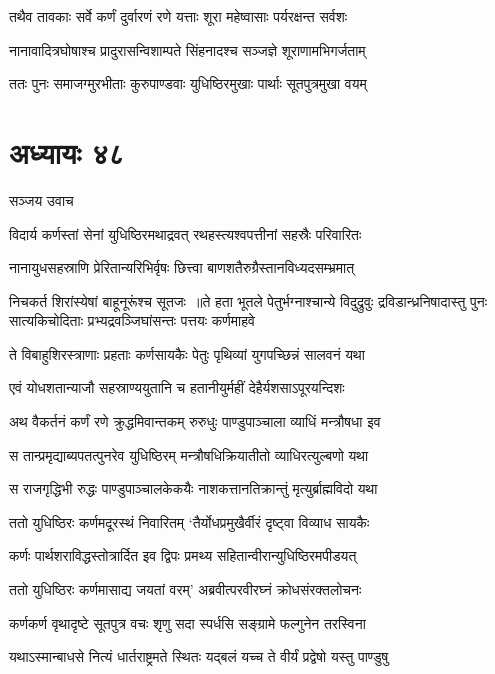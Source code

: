 \twolineshloka
{तथैव तावकाः सर्वे कर्णं दुर्वारणं रणे}
{यत्ताः शूरा महेष्वासाः पर्यरक्षन्त सर्वशः}


\twolineshloka
{नानावादित्रघोषाश्च प्रादुरासन्विशाम्पते}
{सिंहनादश्च सञ्जज्ञे शूराणामभिगर्जताम्}


\twolineshloka
{ततः पुनः समाजग्मुरभीताः कुरुपाण्डवाः}
{युधिष्ठिरमुखाः पार्थाः सूतपुत्रमुखा वयम्}


\chapter{अध्यायः ४८}
\twolineshloka
{सञ्जय उवाच}
{}


\twolineshloka
{विदार्य कर्णस्तां सेनां युधिष्ठिरमथाद्रवत्}
{रथहस्त्यश्वपत्तीनां सहस्रैः परिवारितः}


\twolineshloka
{नानायुधसहस्राणि प्रेरितान्यरिभिर्वृषः}
{छित्त्वा बाणशतैरुग्रैस्तानविध्यदसम्भ्रमात्}


निचकर्त शिरांस्येषां बाहूनूरूंश्च सूतजः ॥ते हता भूतले पेतुर्भग्नाश्चान्ये विदुद्रुवुः
\twolineshloka
{द्रविडान्ध्रनिषादास्तु पुनः सात्यकिचोदिताः}
{प्रभ्यद्रवञ्जिघांसन्तः पत्तयः कर्णमाहवे}


\twolineshloka
{ते विबाहुशिरस्त्राणाः प्रहताः कर्णसायकैः}
{पेतुः पृथिव्यां युगपच्छिन्नं सालवनं यथा}


\twolineshloka
{एवं योधशतान्याजौ सहस्राण्ययुतानि च}
{हतानीयुर्महीं देहैर्यशसाऽपूरयन्दिशः}


\twolineshloka
{अथ वैकर्तनं कर्णं रणे क्रुद्धमिवान्तकम्}
{रुरुधुः पाण्डुपाञ्चाला व्याधिं मन्त्रौषधा इव}


\twolineshloka
{स तान्प्रमृद्याब्यपतत्पुनरेव युधिष्ठिरम्}
{मन्त्रौषधिक्रियातीतो व्याधिरत्युल्बणो यथा}


\twolineshloka
{स राजगृद्धिभी रुद्धः पाण्डुपाञ्चालकेकयैः}
{नाशकत्तानतिक्रान्तुं मृत्युर्ब्राह्मविदो यथा}


\twolineshloka
{ततो युधिष्ठिरः कर्णमदूरस्थं निवारितम्}
{`तैर्योधप्रमुखैर्वीरं दृष्ट्वा विव्याध सायकैः}


\twolineshloka
{कर्णः पार्थशराविद्धस्तोत्रार्दित इव द्विपः}
{प्रमथ्य सहितान्वीरान्युधिष्ठिरमपीडयत्}


\twolineshloka
{ततो युधिष्ठिरः कर्णमासाद्य जयतां वरम्'}
{अब्रवीत्परवीरघ्नं क्रोधसंरक्तलोचनः}


\twolineshloka
{कर्णकर्ण वृथादृष्टे सूतपुत्र वचः शृणु}
{सदा स्पर्धसि सङ्ग्रामे फल्गुनेन तरस्विना}


\twolineshloka
{यथाऽस्मान्बाधसे नित्यं धार्तराष्ट्रमते स्थितः}
{यद्बलं यच्च ते वीर्यं प्रद्वेषो यस्तु पाण्डुषु}


